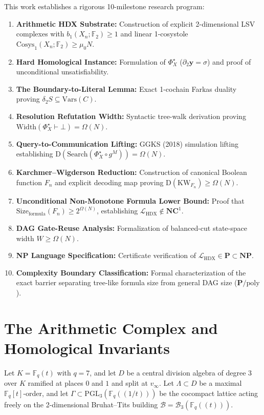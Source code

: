 \documentclass[11pt,a4paper]{article}
\theoremstyle{definition}
\newcommand{\KW}{\mathrm{KW}}
\newcommand{\Width}{\mathrm{Width}}
\newcommand{\Size}{\mathrm{Size}}
\newcommand{\Cosys}{\mathrm{Cosys}}
\newcommand{\Vars}{\mathrm{Vars}}
\begin{document}
This work establishes a rigorous 10-milestone research program:
\begin{enumerate}[label=\textbf{Milestone \arabic*:}, leftmargin=*]
\item \textbf{Arithmetic HDX Substrate:} Construction of explicit 2-dimensional LSV complexes with $b_1(X_n; \mathbb{F}_2) \ge 1$ and linear 1-cosystole $\Cosys_1(X_n; \mathbb{F}_2) \ge \mu_0 N$.
\item \textbf{Hard Homological Instance:} Formulation of $\Phi_X^\star$ ($\partial_2 \mathbf{y} = \sigma$) and proof of unconditional unsatisfiability.
\item \textbf{The Boundary-to-Literal Lemma:} Exact 1-cochain Farkas duality proving $\delta_2 S \subseteq \Vars(C)$.
\item \textbf{Resolution Refutation Width:} Syntactic tree-walk derivation proving $\Width(\Phi_X^\star \vdash \bot) = \Omega(N)$.
\item \textbf{Query-to-Communication Lifting:} GGKS (2018) simulation lifting establishing $\mathrm{D}(\mathrm{Search}(\Phi_X^\star \circ g^M)) = \Omega(N)$.
\item \textbf{Karchmer--Wigderson Reduction:} Construction of canonical Boolean function $F_n$ and explicit decoding map proving $\mathrm{D}(\KW_{F_n}) \ge \Omega(N)$.
\item \textbf{Unconditional Non-Monotone Formula Lower Bound:} Proof that $\Size_{\mathrm{formula}}(F_n) \ge 2^{\Omega(N)}$, establishing $\mathcal{L}_{\mathrm{HDX}} \notin \mathbf{NC}^1$.
\item \textbf{DAG Gate-Reuse Analysis:} Formalization of balanced-cut state-space width $W \ge \Omega(N)$.
\item \textbf{NP Language Specification:} Certificate verification of $\mathcal{L}_{\mathrm{HDX}} \in \mathbf{P} \subset \mathbf{NP}$.
\item \textbf{Complexity Boundary Classification:} Formal characterization of the exact barrier separating tree-like formula size from general DAG size ($\mathbf{P}/\mathrm{poly}$).
\end{enumerate}

\section{The Arithmetic Complex and Homological Invariants}
Let $K = \mathbb{F}_q(t)$ with $q = 7$, and let $D$ be a central division algebra of degree 3 over $K$ ramified at places $0$ and $1$ and split at $v_\infty$. Let $\Lambda \subset D$ be a maximal $\mathbb{F}_q[t]$-order, and let $\Gamma \subset \mathrm{PGL}_3(\mathbb{F}_q((1/t)))$ be the cocompact lattice acting freely on the 2-dimensional Bruhat--Tits building $\mathcal{B} = \mathcal{B}_3(\mathbb{F}_q((t)))$.
\end{document}
